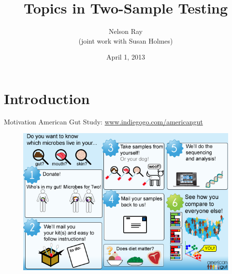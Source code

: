 \documentclass{beamer}
\begin{document}
\title[Topics in Two-Sample Testing]{Topics in Two-Sample Testing}
\author[N. Ray]{Nelson Ray \\
  (joint work with Susan Holmes)}
\date{April 1, 2013}

\begin{frame}
  \titlepage
\end{frame}

\section{Introduction}
\begin{frame}{Motivation}
  American Gut Study: \url{www.indiegogo.com/americangut}
  \begin{figure}
    \centering
    \includegraphics[scale=.5]{american_gut.png}
  \end{figure}
\end{frame}
\end{document}
